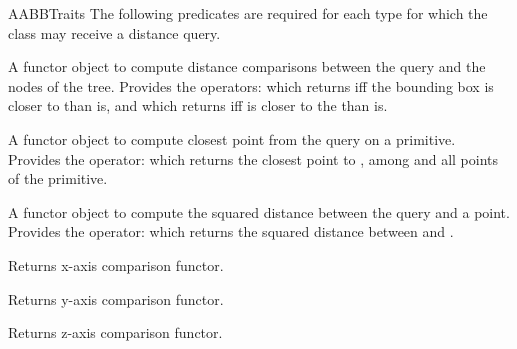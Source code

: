 \begin{ccRefConcept}{AABBTraits}
The following predicates are required for each type 
for which the class  may receive a distance query.

{} 
{A functor object to compute distance comparisons between the query and the nodes of the tree. Provides the operators:
 which returns  iff the bounding box is closer to  than  is, and  which returns  iff  is closer to the  than  is.}

{} 
{A functor object to compute closest point from the query on a primitive. Provides the operator:
 which returns the closest point to , among  and all points of the primitive.}

{A functor object to compute the squared distance between the query and a point. Provides the operator:
 which returns the squared distance between  and .}

\ccCreation
{}  %


\ccOperations

{Returns x-axis comparison functor.}

{Returns y-axis comparison functor.}

{Returns z-axis comparison functor.}


\end{ccRefConcept}
